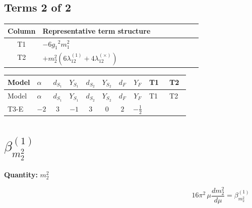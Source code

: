 \documentclass[8pt]{article}
\begin{document}
\begin{landscape}
\subsection*{Terms 2 of 2}
\begin{center}
\begin{tabular}{@{}c >{\raggedright\arraybackslash}p{0.82\linewidth}@{}}
\toprule
Column & Representative term structure \\
\midrule
T1 & \(\displaystyle -6 {g_1}^2 {m_1^2}\) \\
\midrule
T2 & \(\displaystyle +{m_2^2} (6 {\lambda_{12}^{(1)}}+4 {\lambda_{12}^{(\times)}})\) \\
\midrule
\bottomrule
\end{tabular}
\end{center}
\smallskip
\tiny
\begin{longtable}{@{}llcccccc >{\raggedright\arraybackslash}p{0.21\linewidth} >{\raggedright\arraybackslash}p{0.21\linewidth}@{}}
\toprule
Model & $\alpha$ & $d_{S_1}$ & $Y_{S_1}$ & $d_{S_2}$ & $Y_{S_2}$ & $d_F$ & $Y_F$ & T1 & T2 \\
\midrule
\endfirsthead
\toprule
Model & $\alpha$ & $d_{S_1}$ & $Y_{S_1}$ & $d_{S_2}$ & $Y_{S_2}$ & $d_F$ & $Y_F$ & T1 & T2 \\
\midrule
\endhead
T3-E & $-2$ & $3$ & $-1$ & $3$ & $0$ & $2$ & $-\frac{1}{2}$ & \scriptsize\adjustbox{max width=\linewidth}{$\begin{gathered} -6 {g_1}^2 {m_1^2}\end{gathered}$} & \scriptsize\adjustbox{max width=\linewidth}{$\begin{gathered} +{m_2^2} (6 {\lambda_{12}^{(1)}}+4 {\lambda_{12}^{(\times)}})\end{gathered}$} \\
\midrule
\bottomrule
\end{longtable}
\clearpage
\section*{$\beta_{m_2^2}^{(1)}$}
\noindent\textbf{Quantity: }$m_2^2$\par\smallskip
\[16\pi^2\,\mu\frac{d m_2^2}{d\mu}=\beta_{m_2^2}^{(1)}\]

\end{landscape}
\end{document}
